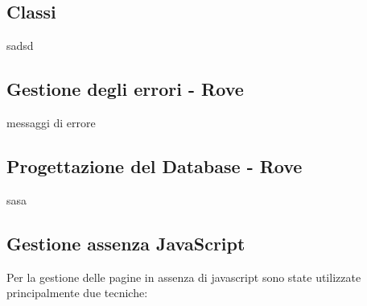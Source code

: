 \documentclass[12pt]{article}
\begin{document}
	\subsection{Classi}
	sadsd
	\subsection{Gestione degli errori - Rove}
	messaggi di errore
	\subsection{Progettazione del Database - Rove}
	sasa
	\subsection{Gestione assenza JavaScript}
	Per la gestione delle pagine in assenza di javascript sono state utilizzate principalmente due tecniche:
\end{document}
